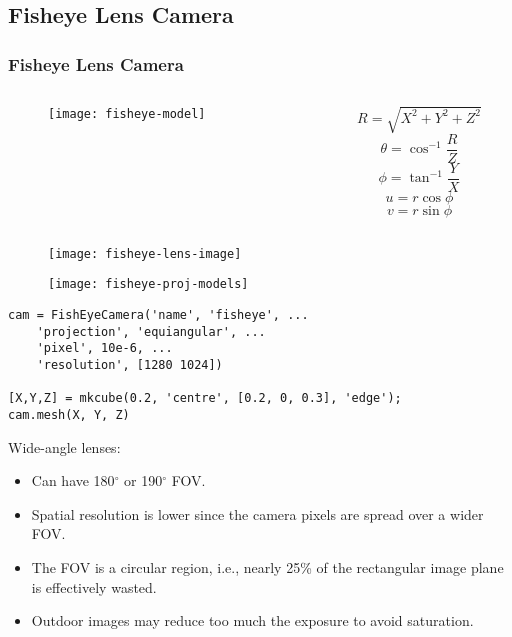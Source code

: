 \subsection{Fisheye Lens Camera}

\begin{frame}
\frametitle{Fisheye Lens Camera}
\begin{columns}
\begin{column}{.7\textwidth}
\begin{figure}[!h]
\centering
\texttt{[image: fisheye-model]}
\end{figure}
\end{column}
\begin{column}{.4\textwidth}
\[
R = \sqrt{X^2 + Y^2 + Z^2}
\]
\[
\theta = \cos ^{-1} \dfrac{R}{Z}
\]
\[
\phi = \tan^{-1} \dfrac{Y}{X}
\]
\[
u = r\cos\phi
\]
\[
v = r\sin\phi
\]
\end{column}
\end{columns}
\end{frame}

\begin{frame}
\begin{figure}[!h]
\centering
\texttt{[image: fisheye-lens-image]}
\end{figure}
\begin{figure}[!h]
\centering
\texttt{[image: fisheye-proj-models]}
\end{figure}
\end{frame}

\begin{frame}[fragile]
\begin{lstlisting}
cam = FishEyeCamera('name', 'fisheye', ...
    'projection', 'equiangular', ...
    'pixel', 10e-6, ...
    'resolution', [1280 1024])

[X,Y,Z] = mkcube(0.2, 'centre', [0.2, 0, 0.3], 'edge');
cam.mesh(X, Y, Z)
\end{lstlisting}
\end{frame}

\begin{frame}
Wide-angle lenses:
\begin{itemize}
\item Can have 180$^{\circ}$ or 190$^{\circ}$ FOV.
\item Spatial resolution is lower since the camera pixels are spread over a wider FOV.
\item The FOV is a circular region, i.e., nearly 25\% of the rectangular image plane is effectively wasted.
\item Outdoor images may reduce too much the exposure to avoid saturation.
\end{itemize}
\end{frame}

